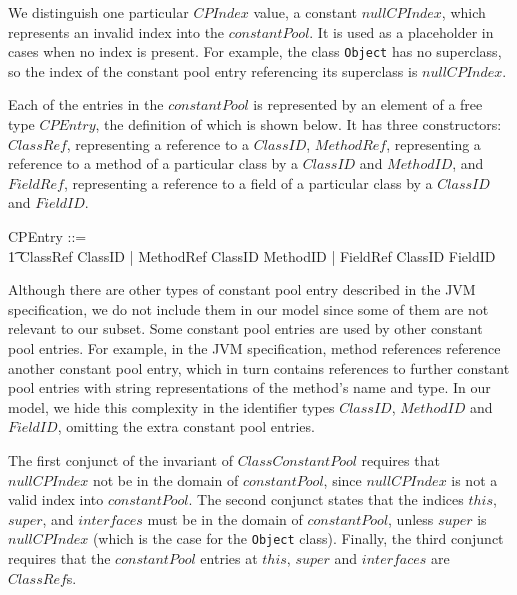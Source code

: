 We distinguish one particular $CPIndex$ value, a constant
$nullCPIndex$, which represents an invalid index into the
$constantPool$.
It is used as a placeholder in cases when no index is present.
For example, the class \texttt{Object} has no superclass, so the index
of the constant pool entry referencing its superclass is
$nullCPIndex$.

Each of the entries in the $constantPool$ is represented by an element
of a free type $CPEntry$, the definition of which is shown below.
It has three constructors:~$ClassRef$, representing a reference to a
$ClassID$, $MethodRef$, representing a reference to a method of a
particular class by a $ClassID$ and $MethodID$, and $FieldRef$,
representing a reference to a field of a particular class by a
$ClassID$ and $FieldID$.
\begin{zed}
  CPEntry ::= \\
  \t1 ClassRef \ldata ClassID \rdata | MethodRef \ldata
  ClassID \cross MethodID \rdata | FieldRef \ldata ClassID \cross
  FieldID \rdata
\end{zed}
Although there are other types of constant pool entry described in the
JVM specification, we do not include them in our model since some of
them are not relevant to our subset. 
Some constant pool entries are used by other constant pool entries.
For example, in the JVM specification, method references reference
another constant pool entry, which in turn contains references to
further constant pool entries with string representations of the
method's name and type.
In our model, we hide this complexity in the identifier types
$ClassID$, $MethodID$ and $FieldID$, omitting the extra constant pool
entries.

The first conjunct of the invariant of $ClassConstantPool$ requires
that $nullCPIndex$ not be in the domain of $constantPool$, since
$nullCPIndex$ is not a valid index into $constantPool$.
The second conjunct states that the indices $this$, $super$, and
$interfaces$ must be in the domain of $constantPool$, unless $super$
is $nullCPIndex$ (which is the case for the \texttt{Object} class).
Finally, the third conjunct requires that the $constantPool$ entries
at $this$, $super$ and $interfaces$ are $ClassRef$s.

